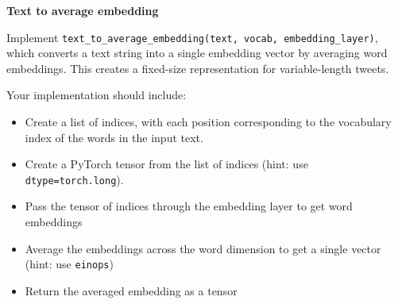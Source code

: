 \item {} \textbf{Text to average embedding}

Implement \texttt{text\_to\_average\_embedding(text, vocab, embedding\_layer)},
which converts a text string into a single embedding vector by averaging word embeddings. This creates a fixed-size representation
for variable-length tweets.

Your implementation should include: 
\begin{itemize}
    \item Create a list of indices, with each position corresponding to the vocabulary index of the words in the input text.
    \item Create a PyTorch tensor from the list of indices (hint: use \texttt{dtype=torch.long}).
    \item Pass the tensor of indices through the embedding layer to get word embeddings
    \item Average the embeddings across the word dimension to get a single vector (hint: use \texttt{einops})
    \item Return the averaged embedding as a tensor
\end{itemize}